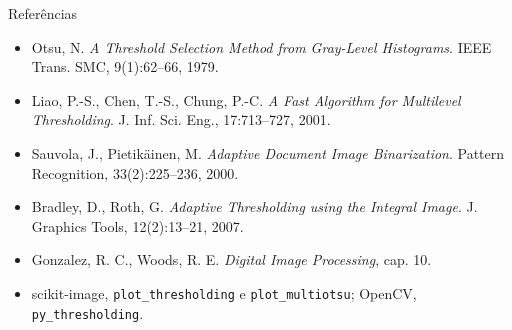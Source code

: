 \documentclass[aspectratio=169,12pt]{beamer}
\begin{document}
\begin{frame}{Referências}

  \footnotesize
  \begin{itemize}
    \item Otsu, N. \emph{A Threshold Selection Method from Gray-Level
      Histograms}. IEEE Trans. SMC, 9(1):62--66, 1979.
    \item Liao, P.-S., Chen, T.-S., Chung, P.-C. \emph{A Fast Algorithm for
      Multilevel Thresholding}. J. Inf. Sci. Eng., 17:713--727, 2001.
    \item Sauvola, J., Pietikäinen, M. \emph{Adaptive Document Image
      Binarization}. Pattern Recognition, 33(2):225--236, 2000.
    \item Bradley, D., Roth, G. \emph{Adaptive Thresholding using the Integral
      Image}. J. Graphics Tools, 12(2):13--21, 2007.
    \item Gonzalez, R. C., Woods, R. E. \emph{Digital Image Processing}, cap. 10.
    \item scikit-image, \texttt{plot\_thresholding} e \texttt{plot\_multiotsu};
      OpenCV, \texttt{py\_thresholding}.
  \end{itemize}

\end{frame}
\end{document}
